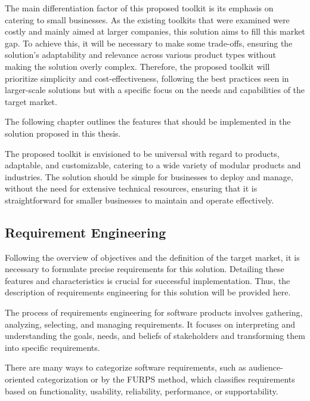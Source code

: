 The main differentiation factor of this proposed toolkit is its emphasis on catering to small businesses. As the existing toolkits that were examined were costly and mainly aimed at larger companies, this solution aims to fill this market gap. To achieve this, it will be necessary to make some trade-offs, ensuring the solution's adaptability and relevance across various product types without making the solution overly complex. Therefore, the proposed toolkit will prioritize simplicity and cost-effectiveness, following the best practices seen in larger-scale solutions but with a specific focus on the needs and capabilities of the target market.

The following chapter outlines the features that should be implemented in the solution proposed in this thesis.
 
The proposed toolkit is envisioned to be universal with regard to products, adaptable, and customizable, catering to a wide variety of modular products and industries. The solution should be simple for businesses to deploy and manage, without the need for extensive technical resources, ensuring that it is straightforward for smaller businesses to maintain and operate effectively.

\subsection{Requirement Engineering} \label{section:requirements}

Following the overview of objectives and the definition of the target market, it is necessary to formulate precise requirements for this solution. Detailing these features and characteristics is crucial for successful implementation. Thus, the description of requirements engineering for this solution will be provided here.

The process of requirements engineering for software products involves gathering, analyzing, selecting, and managing requirements. It focuses on interpreting and understanding the goals, needs, and beliefs of stakeholders and transforming them into specific requirements. \cite{Aurum2005}

There are many ways to categorize software requirements, such as audience-oriented categorization or by the FURPS method, which classifies requirements based on functionality, usability, reliability, performance, or supportability. \cite{Stephens2023}

